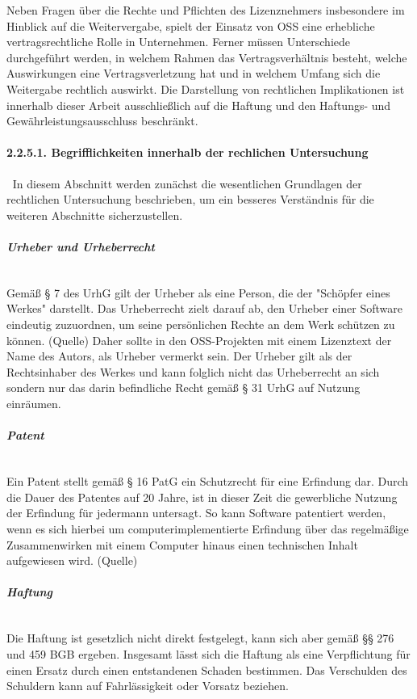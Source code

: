 Neben Fragen über die Rechte und Pflichten des Lizenznehmers insbesondere im Hinblick auf die Weitervergabe, spielt der Einsatz von OSS eine erhebliche vertragsrechtliche Rolle in Unternehmen. Ferner müssen Unterschiede durchgeführt werden, in welchem Rahmen das Vertragsverhältnis besteht, welche Auswirkungen eine Vertragsverletzung hat und in welchem Umfang sich die Weitergabe rechtlich auswirkt. Die Darstellung von rechtlichen Implikationen ist innerhalb dieser Arbeit ausschließlich auf die Haftung und den Haftungs- und Gewährleistungsausschluss beschränkt. 

\paragraph{2.2.5.1. Begrifflichkeiten innerhalb der rechlichen Untersuchung} $~$
In diesem Abschnitt werden zunächst die wesentlichen Grundlagen der rechtlichen Untersuchung beschrieben, um ein besseres Verständnis für die weiteren Abschnitte sicherzustellen. 

\subparagraph{Urheber und Urheberrecht}$~$

Gemäß § 7 des UrhG gilt der Urheber als eine Person, die der "Schöpfer eines Werkes" darstellt. Das Urheberrecht zielt darauf ab, den Urheber einer Software eindeutig zuzuordnen, um seine persönlichen Rechte an dem Werk schützen zu können. (Quelle) Daher sollte in den OSS-Projekten mit einem Lizenztext der Name des Autors, als Urheber vermerkt sein. Der Urheber gilt als der Rechtsinhaber des Werkes und kann folglich nicht das Urheberrecht an sich sondern nur das darin befindliche Recht gemäß § 31 UrhG auf Nutzung einräumen. 

\subparagraph{Patent}$~$

Ein Patent stellt gemäß § 16 PatG ein Schutzrecht für eine Erfindung dar. Durch die Dauer des Patentes auf 20 Jahre, ist in dieser Zeit die gewerbliche Nutzung der Erfindung für jedermann untersagt. So kann Software patentiert werden, wenn es sich hierbei um computerimplementierte Erfindung über das regelmäßige Zusammenwirken mit einem Computer hinaus einen technischen Inhalt aufgewiesen wird. (Quelle)  

\subparagraph{Haftung}$~$

Die Haftung ist gesetzlich nicht direkt festgelegt, kann sich aber gemäß §§ 276 und 459 BGB ergeben. Insgesamt lässt sich die Haftung als eine Verpflichtung für einen Ersatz durch einen entstandenen Schaden bestimmen. Das Verschulden des Schuldern kann auf Fahrlässigkeit oder Vorsatz beziehen. 

